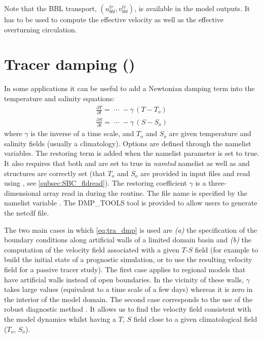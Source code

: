 \documentclass[../main/NEMO_manual]{subfiles}
\begin{document}
Note that the BBL transport, $( u^{tr}_{bbl}, v^{tr}_{bbl} )$, is available in the model outputs.
It has to be used to compute the effective velocity as well as the effective overturning circulation.

\section{Tracer damping (\protect{})}
\label{sec:TRA_dmp}


In some applications it can be useful to add a Newtonian damping term into the temperature and salinity equations:
\begin{equation}
  \label{eq:tra_dmp}
  \begin{split}
    \frac{\partial T}{\partial t}=\;\cdots \;-\gamma \,\left( {T-T_o } \right)  \\
    \frac{\partial S}{\partial t}=\;\cdots \;-\gamma \,\left( {S-S_o } \right)
  \end{split}
\end{equation} 
where $\gamma$ is the inverse of a time scale, and $T_o$ and $S_o$ are given temperature and salinity fields
(usually a climatology).
Options are defined through the   namelist variables.
The restoring term is added when the namelist parameter  is set to true.
It also requires that both  and  are set to true in
\textit{namtsd} namelist as well as  and  structures are correctly set
(\ie that $T_o$ and $S_o$ are provided in input files and read using ,
see \autoref{subsec:SBC_fldread}).
The restoring coefficient $\gamma$ is a three-dimensional array read in during the  routine.
The file name is specified by the namelist variable .
The DMP\_TOOLS tool is provided to allow users to generate the netcdf file.

The two main cases in which \autoref{eq:tra_dmp} is used are
\textit{(a)} the specification of the boundary conditions along artificial walls of a limited domain basin and
\textit{(b)} the computation of the velocity field associated with a given $T$-$S$ field
(for example to build the initial state of a prognostic simulation,
or to use the resulting velocity field for a passive tracer study).
The first case applies to regional models that have artificial walls instead of open boundaries.
In the vicinity of these walls, $\gamma$ takes large values (equivalent to a time scale of a few days) whereas
it is zero in the interior of the model domain.
The second case corresponds to the use of the robust diagnostic method \citep{Sarmiento1982}.
It allows us to find the velocity field consistent with the model dynamics whilst
having a $T$, $S$ field close to a given climatological field ($T_o$, $S_o$). 
\end{document}
